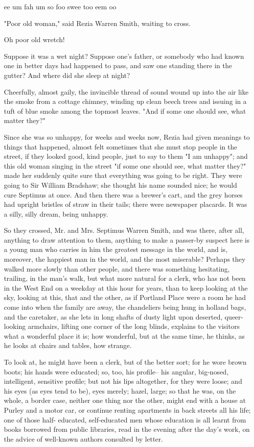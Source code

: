 \documentclass[lang=cn,10pt]{elegantbook}
\begin{document}
     ee um fah um so
     foo swee too eem oo


"Poor old woman," said Rezia Warren Smith, waiting to cross.

Oh poor old wretch!

Suppose it was a wet night?  Suppose one's father, or somebody who
had known one in better days had happened to pass, and saw one
standing there in the gutter?  And where did she sleep at night?

Cheerfully, almost gaily, the invincible thread of sound wound up
into the air like the smoke from a cottage chimney, winding up
clean beech trees and issuing in a tuft of blue smoke among the
topmost leaves.  "And if some one should see, what matter they?"

Since she was so unhappy, for weeks and weeks now, Rezia had given
meanings to things that happened, almost felt sometimes that she
must stop people in the street, if they looked good, kind people,
just to say to them "I am unhappy"; and this old woman singing in
the street "if some one should see, what matter they?" made her
suddenly quite sure that everything was going to be right.  They
were going to Sir William Bradshaw; she thought his name sounded
nice; he would cure Septimus at once.  And then there was a
brewer's cart, and the grey horses had upright bristles of straw in
their tails; there were newspaper placards.  It was a silly, silly
dream, being unhappy.

So they crossed, Mr. and Mrs. Septimus Warren Smith, and was there,
after all, anything to draw attention to them, anything to make a
passer-by suspect here is a young man who carries in him the
greatest message in the world, and is, moreover, the happiest man
in the world, and the most miserable?  Perhaps they walked more
slowly than other people, and there was something hesitating,
trailing, in the man's walk, but what more natural for a clerk, who
has not been in the West End on a weekday at this hour for years,
than to keep looking at the sky, looking at this, that and the
other, as if Portland Place were a room he had come into when the
family are away, the chandeliers being hung in holland bags, and
the caretaker, as she lets in long shafts of dusty light upon
deserted, queer-looking armchairs, lifting one corner of the long
blinds, explains to the visitors what a wonderful place it is; how
wonderful, but at the same time, he thinks, as he looks at chairs
and tables, how strange.

To look at, he might have been a clerk, but of the better sort; for
he wore brown boots; his hands were educated; so, too, his profile--
his angular, big-nosed, intelligent, sensitive profile; but not
his lips altogether, for they were loose; and his eyes (as eyes
tend to be), eyes merely; hazel, large; so that he was, on the
whole, a border case, neither one thing nor the other, might end
with a house at Purley and a motor car, or continue renting
apartments in back streets all his life; one of those half-
educated, self-educated men whose education is all learnt from
books borrowed from public libraries, read in the evening after the
day's work, on the advice of well-known authors consulted by
letter.
\end{document}
